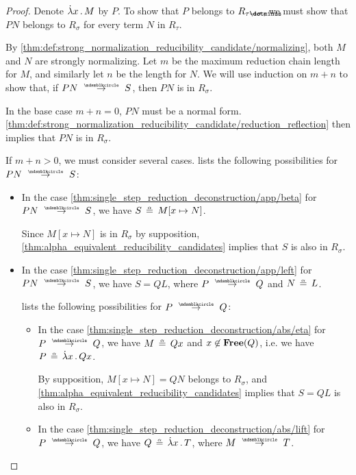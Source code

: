 \begin{proof}
  Denote \( \qabs x M \) by \( P \). To show that \( P \) belongs to \( R_{\tau \synimplies \sigma} \), we must show that \( P N \) belongs to \( R_\sigma \) for every term \( N \) in \( R_\tau \).

  By \ref{thm:def:strong_normalization_reducibility_candidate/normalizing}, both \( M \) and \( N \) are strongly normalizing. Let \( m \) be the maximum reduction chain length for \( M \), and similarly let \( n \) be the length for \( N \). We will use induction on \( m + n \) to show that, if \( P N \pred S \), then \( P N \) is in \( R_\sigma \).

  In the base case \( m + n = 0 \), \( P N \) must be a normal form. \ref{thm:def:strong_normalization_reducibility_candidate/reduction_reflection} then implies that \( P N \) is in \( R_\sigma \).

  If \( m + n > 0 \), we must consider several cases.  lists the following possibilities for \( P N \pred S \):
  \begin{itemize}
    \item In the case \cref{thm:single_step_reduction_deconstruction/app/beta} for \( P N \pred S \), we have \( S \aequiv M[x \mapsto N] \).

    Since \( M[x \mapsto N] \) is in \( R_\sigma \) by supposition, \cref{thm:alpha_equivalent_reducibility_candidates} implies that \( S \) is also in \( R_\sigma \).

    \item In the case \cref{thm:single_step_reduction_deconstruction/app/left} for \( P N \pred S \), we have \( S = Q L \), where \( P \pred Q \) and \( N \aequiv L \).

     lists the following possibilities for \( P \pred Q \):
    \begin{itemize}
      \item In the case \cref{thm:single_step_reduction_deconstruction/abs/eta} for \( P \pred Q \), we have \( M \aequiv Qx \) and \( x \not\in \op*{Free}(Q) \), i.e. we have \( P \aequiv \qabs x Qx \).

      By supposition, \( M[x \mapsto N] = QN \) belongs to \( R_\sigma \), and \cref{thm:alpha_equivalent_reducibility_candidates} implies that \( S = Q L \) is also in \( R_\sigma \).

      \item In the case \cref{thm:single_step_reduction_deconstruction/abs/lift} for \( P \pred Q \), we have \( Q \aequiv \qabs x T \), where \( M \pred T \).


\end{itemize}
\end{itemize}
\end{proof}
